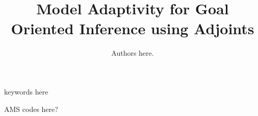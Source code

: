 \documentclass[review]{siamart0516}
\begin{document}
\raggedbottom %

\title{Model Adaptivity for Goal Oriented Inference using Adjoints}

\author{Authors here.}
\maketitle

\begin{abstract}

\end{abstract}

\begin{keywords}
  keywords here
\end{keywords}

\begin{AMS}
  AMS codes here?
\end{AMS}









\end{document}

